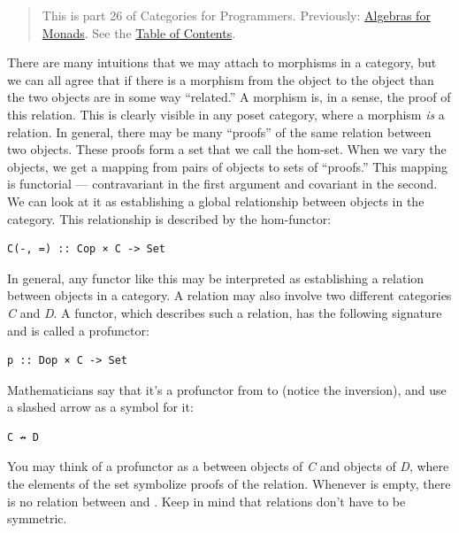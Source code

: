 \begin{quote}
This is part 26 of Categories for Programmers. Previously:
\href{https://bartoszmilewski.com/2017/03/14/algebras-for-monads/}{Algebras
for Monads}. See the
\href{https://bartoszmilewski.com/2014/10/28/category-theory-for-programmers-the-preface/}{Table
of Contents}.
\end{quote}

There are many intuitions that we may attach to morphisms in a category,
but we can all agree that if there is a morphism from the object
 to the object  than the two objects are in some way
``related.'' A morphism is, in a sense, the proof of this relation. This
is clearly visible in any poset category, where a morphism \emph{is} a
relation. In general, there may be many ``proofs'' of the same relation
between two objects. These proofs form a set that we call the hom-set.
When we vary the objects, we get a mapping from pairs of objects to sets
of ``proofs.'' This mapping is functorial --- contravariant in the first
argument and covariant in the second. We can look at it as establishing
a global relationship between objects in the category. This relationship
is described by the hom-functor:

\begin{verbatim}
C(-, =) :: Cop × C -> Set
\end{verbatim}

In general, any functor like this may be interpreted as establishing a
relation between objects in a category. A relation may also involve two
different categories \emph{C} and \emph{D}. A functor, which describes
such a relation, has the following signature and is called a profunctor:

\begin{verbatim}
p :: Dop × C -> Set
\end{verbatim}

Mathematicians say that it's a profunctor from  to 
(notice the inversion), and use a slashed arrow as a symbol for it:

\begin{verbatim}
C ↛ D
\end{verbatim}

You may think of a profunctor as a 
between objects of \emph{C} and objects of \emph{D}, where the elements
of the set symbolize proofs of the relation. Whenever 
is empty, there is no relation between  and . Keep
in mind that relations don't have to be symmetric.

